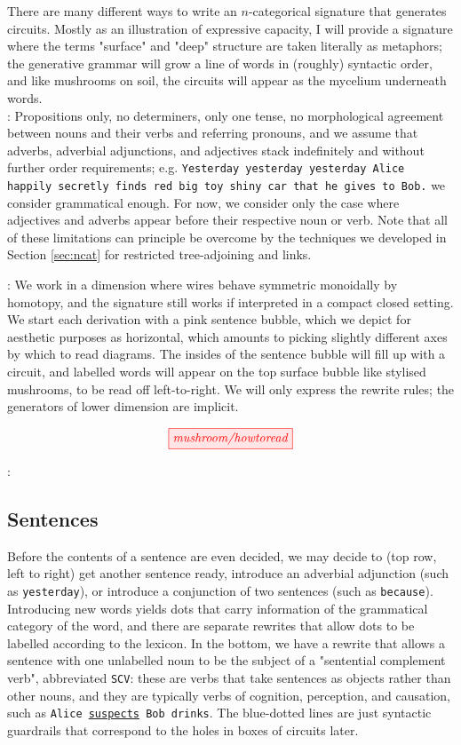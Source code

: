 There are many different ways to write an $n$-categorical signature that generates circuits. Mostly as an illustration of expressive capacity, I will provide a signature where the terms "surface" and "deep" structure are taken literally as metaphors; the generative grammar will grow a line of words in (roughly) syntactic order, and like mushrooms on soil, the circuits will appear as the mycelium underneath words.\\

: Propositions only, no determiners, only one tense, no morphological agreement between nouns and their verbs and referring pronouns, and we assume that adverbs, adverbial adjunctions, and adjectives stack indefinitely and without further order requirements; e.g. \texttt{Yesterday yesterday yesterday Alice happily secretly finds red big toy shiny car that he gives to Bob.} we consider grammatical enough. For now, we consider only the case where adjectives and adverbs appear before their respective noun or verb. Note that all of these limitations can principle be overcome by the techniques we developed in Section \ref{sec:ncat} for restricted tree-adjoining and links.

: We work in a dimension where wires behave symmetric monoidally by homotopy, and the signature still works if interpreted in a compact closed setting. We start each derivation with a pink sentence bubble, which we depict for aesthetic purposes as horizontal, which amounts to picking slightly different axes by which to read diagrams. The insides of the sentence bubble will fill up with a circuit, and labelled words will appear on the top surface bubble like stylised mushrooms, to be read off left-to-right. We will only express the rewrite rules; the generators of lower dimension are implicit.

\[
\tikzfig{mushroom/howtoread}
\]

:

\subsection{Sentences}

Before the contents of a sentence are even decided, we may decide to (top row, left to right) get another sentence ready, introduce an adverbial adjunction (such as \texttt{yesterday}), or introduce a conjunction of two sentences (such as \texttt{because}). Introducing new words yields dots that carry information of the grammatical category of the word, and there are separate rewrites that allow dots to be labelled according to the lexicon. In the bottom, we have a rewrite that allows a sentence with one unlabelled noun to be the subject of a "sentential complement verb", abbreviated \texttt{SCV}: these are verbs that take sentences as objects rather than other nouns, and they are typically verbs of cognition, perception, and causation, such as \texttt{Alice \underline{suspects} Bob drinks}. The blue-dotted lines are just syntactic guardrails that correspond to the holes in boxes of circuits later.

